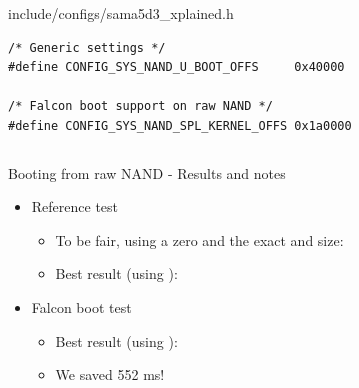 \begin{frame}[fragile]
\begin{columns}
        \begin{block}{include/configs/sama5d3\_xplained.h}
        \begin{verbatim}
/* Generic settings */
#define CONFIG_SYS_NAND_U_BOOT_OFFS     0x40000

/* Falcon boot support on raw NAND */
#define CONFIG_SYS_NAND_SPL_KERNEL_OFFS 0x1a0000
	\end{verbatim}
	\end{block}
   \end{columns}
\end{frame}

\begin{frame}{Booting from raw NAND - Results and notes}
  \small
  \begin{itemize}
     \item Reference test
	\begin{itemize}
           \item To be fair, using a zero  and the exact  and  size:\\
	   \item Best result (using ):\\
	\end{itemize}
     \item Falcon boot test
	\begin{itemize}
	   \item Best result (using ):\\
	   \item We saved 552 ms!
	\end{itemize}
  \end{itemize}
\end{frame}

